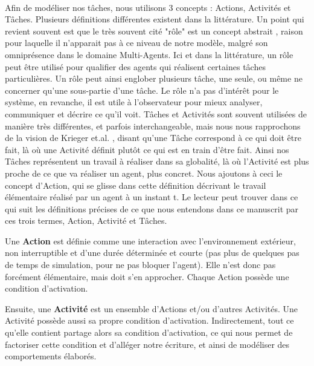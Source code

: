 		\paragraph{}
			Afin de modéliser nos tâches, nous utilisons 3 concepts : Actions, Activités et Tâches. Plusieurs définitions différentes existent dans la littérature. Un point qui revient souvent est que le très souvent cité "rôle" est un concept abstrait \cite{ferber_meta-model_1998, wooldridge_methodology_1999, campbell_multi-agent_2011}, raison pour laquelle il n'apparait pas à ce niveau de notre modèle, malgré son omniprésence dans le domaine Multi-Agents. Ici et dans la littérature, un rôle peut être utilisé pour qualifier des agents qui réalisent certaines tâches particulières. Un rôle peut ainsi englober plusieurs tâche, une seule, ou même ne concerner qu'une sous-partie d'une tâche. Le rôle n'a pas d'intérêt pour le système, en revanche, il est utile à l'observateur pour mieux analyser, communiquer et décrire ce qu'il voit. Tâches et Activités sont souvent utilisées de manière très différentes, et parfois interchangeable, mais nous nous rapprochons de la vision de Krieger et.al. \cite{krieger_call_2000}, disant qu'une Tâche correspond à ce qui doit être fait, là où une Activité définit plutôt ce qui est en train d'être fait. Ainsi nos Tâches représentent un travail à réaliser dans sa globalité, là où l'Activité est plus proche de ce que va réaliser un agent, plus concret. Nous ajoutons à ceci le concept d'Action, qui se glisse dans cette définition décrivant le travail élémentaire réalisé par un agent à un instant t. Le lecteur peut trouver dans ce qui suit les définitions précises de ce que nous entendons dans ce manuscrit par ces trois termes, Action, Activité et Tâches.
			
			Une \textbf{Action} est définie comme une interaction avec l'environnement extérieur, non interruptible et d'une durée déterminée et courte (pas plus de quelques pas de temps de simulation, pour ne pas bloquer l'agent). Elle n'est donc pas forcément élémentaire, mais doit s'en approcher. Chaque Action possède une condition d'activation.
			
			Ensuite, une \textbf{Activité} est un ensemble d'Actions et/ou d'autres Activités. Une Activité possède aussi sa propre condition d'activation. Indirectement, tout ce qu'elle contient partage alors sa condition d'activation, ce qui nous permet de factoriser cette condition et d'alléger notre écriture, et ainsi de modéliser des comportements élaborés.
			
